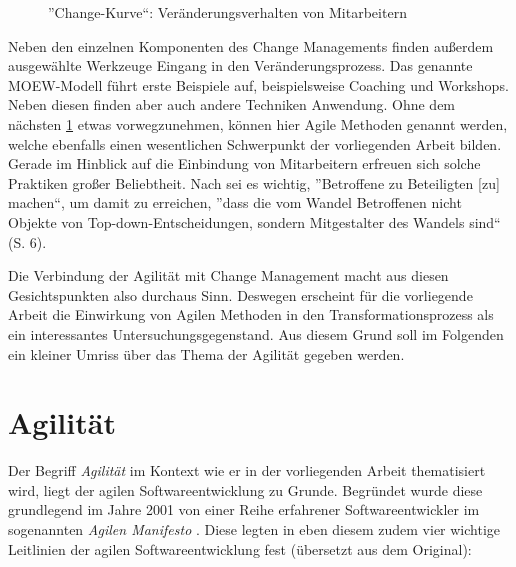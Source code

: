  \begin{figure}
	\centering
	\caption[Change-Kurve von Mitarbeiterverhalten]{''Change-Kurve``: Veränderungsverhalten von Mitarbeitern \protect \cite[S. 3]{bertagnolli_change_2018}}
	\label{fig:changekurve}
\end{figure}

Neben den einzelnen Komponenten des Change Managements finden außerdem ausgewählte Werkzeuge Eingang in den Veränderungsprozess. Das genannte MOEW-Modell führt erste Beispiele auf, beispielsweise Coaching und Workshops. Neben diesen finden aber auch andere Techniken Anwendung. Ohne dem nächsten \ref{background:agile} etwas vorwegzunehmen, können hier Agile Methoden genannt werden, welche ebenfalls einen wesentlichen Schwerpunkt der vorliegenden Arbeit bilden. Gerade im Hinblick auf die Einbindung von Mitarbeitern erfreuen sich solche Praktiken großer Beliebtheit. Nach  sei es wichtig, ''Betroffene zu Beteiligten [zu] machen``, um damit zu erreichen, ''dass die vom Wandel Betroffenen nicht Objekte von Top-down-Entscheidungen, sondern Mitgestalter des
Wandels sind`` (S. 6). 

Die Verbindung der Agilität mit Change Management macht aus diesen Gesichtspunkten also durchaus Sinn. Deswegen erscheint für die vorliegende Arbeit die Einwirkung von Agilen Methoden in den Transformationsprozess als ein interessantes Untersuchungsgegenstand. Aus diesem Grund soll im Folgenden ein kleiner Umriss über das Thema der Agilität gegeben werden.

\section{Agilität}
\label{background:agile}

Der Begriff  \textit{Agilität} im Kontext wie er in der vorliegenden Arbeit thematisiert wird, liegt der agilen Softwareentwicklung zu Grunde. Begründet wurde diese grundlegend im Jahre 2001 von einer Reihe erfahrener Softwareentwickler im sogenannten \textit{Agilen Manifesto} \cite{beck_manifesto}. Diese legten in eben diesem zudem vier wichtige Leitlinien der agilen Softwareentwicklung fest (übersetzt aus dem Original):

